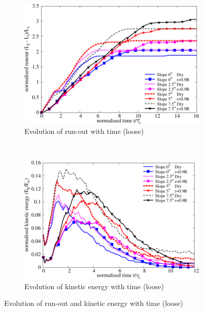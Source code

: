 \begin{figure}
\centering
\begin{subfigure}[b]{0.95\textwidth}
\centering
\includegraphics[width=0.97\columnwidth]{Runout_loose_slope}
\caption{Evolution of run-out with time (loose)}
\label{fig:run_loose}
\end{subfigure} \\
\begin{subfigure}[b]{0.95\textwidth}
\centering
\includegraphics[width=0.97\columnwidth]{KE_loose_slope}
\caption{Evolution of kinetic energy with time (loose)}
\label{fig:KE_loose}
\end{subfigure}
\caption[Evolution of run-out and kinetic energy with time (loose) for 
different slope angles]{Evolution of run-out and kinetic energy with time 
(loose)}
\label{fig:KE_run_loose}
\end{figure}

